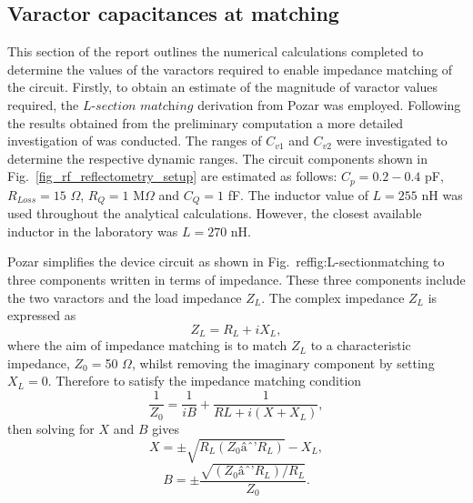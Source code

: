 \documentclass[10pt,a4paper,twoside]{article}
\begin{document}
\begin{multicols}{2}
\subsection{\label{varactorimpedancematching}Varactor capacitances at matching}
This section of the report outlines the numerical calculations completed to determine the values of the varactors required to enable impedance matching of the circuit. Firstly, to obtain an estimate of the magnitude of varactor values required, the $\textit{L-section  matching}$ derivation from Pozar \cite{pozar2004microwave} was employed. Following the results obtained from the preliminary computation a more detailed investigation of was conducted. The ranges of $C_{v1}$ and $C_{v2}$ were investigated to determine the respective dynamic ranges. The circuit components shown in Fig.~\ref{fig_rf_reflectometry_setup} are estimated as follows: $C_{p}=0.2-0.4$ pF, $R_{Loss}=15$ $\Omega$, $R_{Q}=1$ M$\Omega$ and $C_{Q}=1$ fF. The inductor value of $L= 255$ nH was used throughout the analytical calculations. However, the closest available inductor in the laboratory was $L =270$ nH.
\par
Pozar \cite{pozar2004microwave} simplifies the device circuit as shown in Fig.~ref{fig:L-sectionmatching} to three components written in terms of impedance. These three components include the two varactors and the load impedance $Z_{L}$. The complex impedance $Z_{L}$ is expressed as
\begin{equation}
\label{eq:compleximpedance}
Z_{L}=R_{L}+i X_{L},
\end{equation}
\noindent where the aim of impedance matching is to match $Z_{L}$ to a characteristic impedance, $Z_{0}=$50 $\Omega$, whilst removing the imaginary component by setting $X_{L}=0$. Therefore to satisfy the impedance matching condition
\begin{equation}
\label{eq:compleximpedance}
\frac{1}{Z_{0}}=\frac{1}{iB}+\frac{1}{RL + i(X+X_{L})},
\end{equation}
\noindent then solving for $X$ and $B$ gives
\begin{equation}
\label{eq:Xsolved}
X=\pm \sqrt{R_{L}(Z_{0} â R_{L})}-X_{L},
\end{equation}
\begin{equation}
\label{eq:Bsolved}
B=\pm \frac{\sqrt{(Z_{0} â R_{L})/R_{L}}}{Z_{0}}.

\end{equation}
\end{multicols}
\end{document}
